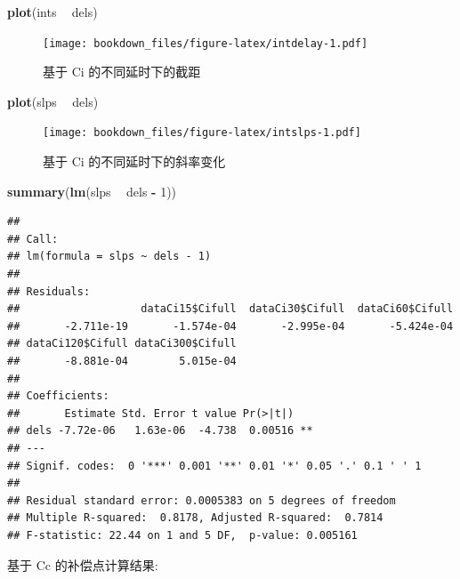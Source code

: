 \documentclass[
]{krantz}
\makeatletter
\newenvironment{Shaded}{\begin{snugshade}}{\end{snugshade}}
\newcommand{\DecValTok}[1]{\textcolor[rgb]{0.00,0.00,0.81}{#1}}
\newcommand{\KeywordTok}[1]{\textcolor[rgb]{0.13,0.29,0.53}{\textbf{#1}}}
\newcommand{\NormalTok}[1]{#1}
\newcommand{\OperatorTok}[1]{\textcolor[rgb]{0.81,0.36,0.00}{\textbf{#1}}}
\newcommand{\StringTok}[1]{\textcolor[rgb]{0.31,0.60,0.02}{#1}}
\newenvironment{kframe}{%
\medskip{}
\setlength{\fboxsep}{.8em}
 \def\at@end@of@kframe{}%
 \ifinner\ifhmode%
  \def\at@end@of@kframe{\end{minipage}}%
  \begin{minipage}{\columnwidth}%
 \fi\fi%
 \def\FrameCommand##1{\hskip\@totalleftmargin \hskip-\fboxsep
 \colorbox{shadecolor}{##1}\hskip-\fboxsep
     \hskip-\linewidth \hskip-\@totalleftmargin \hskip\columnwidth}%
 \MakeFramed {\advance\hsize-\width
   \@totalleftmargin\z@ \linewidth\hsize
   \@setminipage}}%
 {\par\unskip\endMakeFramed%
 \at@end@of@kframe}
\renewenvironment{Shaded}{\begin{kframe}}{\end{kframe}}
\makeatother
\begin{document}
\begin{Shaded}
\begin{Highlighting}[]
\KeywordTok{plot}\NormalTok{(ints }\OperatorTok{~}\StringTok{ }\NormalTok{dels)}
\end{Highlighting}
\end{Shaded}

\begin{figure}
\centering
\texttt{[image: bookdown\_files/figure-latex/intdelay-1.pdf]}
\caption{\label{fig:intdelay}基于 Ci 的不同延时下的截距}
\end{figure}

\begin{Shaded}
\begin{Highlighting}[]
\KeywordTok{plot}\NormalTok{(slps }\OperatorTok{~}\StringTok{ }\NormalTok{dels)}
\end{Highlighting}
\end{Shaded}

\begin{figure}
\centering
\texttt{[image: bookdown\_files/figure-latex/intslps-1.pdf]}
\caption{\label{fig:intslps}基于 Ci 的不同延时下的斜率变化}
\end{figure}

\begin{Shaded}
\begin{Highlighting}[]
\KeywordTok{summary}\NormalTok{(}\KeywordTok{lm}\NormalTok{(slps }\OperatorTok{~}\StringTok{ }\NormalTok{dels }\OperatorTok{-}\StringTok{ }\DecValTok{1}\NormalTok{))}
\end{Highlighting}
\end{Shaded}

\begin{verbatim}
## 
## Call:
## lm(formula = slps ~ dels - 1)
## 
## Residuals:
##                   dataCi15$Cifull  dataCi30$Cifull  dataCi60$Cifull 
##       -2.711e-19       -1.574e-04       -2.995e-04       -5.424e-04 
## dataCi120$Cifull dataCi300$Cifull 
##       -8.881e-04        5.015e-04 
## 
## Coefficients:
##       Estimate Std. Error t value Pr(>|t|)   
## dels -7.72e-06   1.63e-06  -4.738  0.00516 **
## ---
## Signif. codes:  0 '***' 0.001 '**' 0.01 '*' 0.05 '.' 0.1 ' ' 1
## 
## Residual standard error: 0.0005383 on 5 degrees of freedom
## Multiple R-squared:  0.8178, Adjusted R-squared:  0.7814 
## F-statistic: 22.44 on 1 and 5 DF,  p-value: 0.005161
\end{verbatim}

基于 Cc 的补偿点计算结果:
\end{document}
